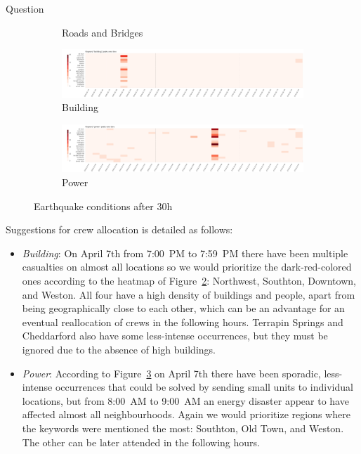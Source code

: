 \begin{section}{Question}
\begin{figure}[!h]
\begin{subfigure}[!h]{0.48\textwidth}
        \caption{Roads and Bridges}
        \label{fig:roads_30h}
    \end{subfigure}
    \begin{subfigure}[!h]{0.48\textwidth}
        \centering
        \includegraphics[width=1.00\textwidth]{figs/cond_30h/cond_30h_build.png}
        \caption{Building}
        \label{fig:building_30h}
    \end{subfigure}
    \begin{subfigure}[!h]{0.48\textwidth}
        \centering
        \includegraphics[width=1.00\textwidth]{figs/cond_30h/cond_30h_power.png}
        \caption{Power}
        \label{fig:power_30h}
    \end{subfigure}
    \caption{Earthquake conditions after 30h}
    \label{fig:eq_cond_30h}
\end{figure}

Suggestions for crew allocation is detailed as follows:

\begin{itemize}
    \item \emph{Building}: On April 7th from 7:00~PM to 7:59~PM there have been
    multiple casualties on almost all locations so we would prioritize the
    dark-red-colored ones according to the heatmap of
    Figure~\ref{fig:building_30h}:
    Northwest, Southton, Downtown, and Weston. All four have a high 
    density of buildings and people, apart from being geographically close to
    each other, which can be an advantage for an eventual reallocation of crews
    in the following hours. Terrapin Springs and Cheddarford also have some
    less-intense occurrences, but they must be ignored due to the absence of
    high buildings.
    \item \emph{Power}: According to Figure~\ref{fig:power_30h} on April 7th 
    there have been sporadic, less-intense
    occurrences that could be solved by sending small units to individual
    locations, but from 8:00~AM to 9:00~AM an energy disaster appear to have
    affected almost all neighbourhoods. Again we would prioritize regions where
    the keywords were mentioned the most: Southton, Old Town, and Weston. The
    other can be later attended in the following hours.
\end{itemize}
\end{section}
